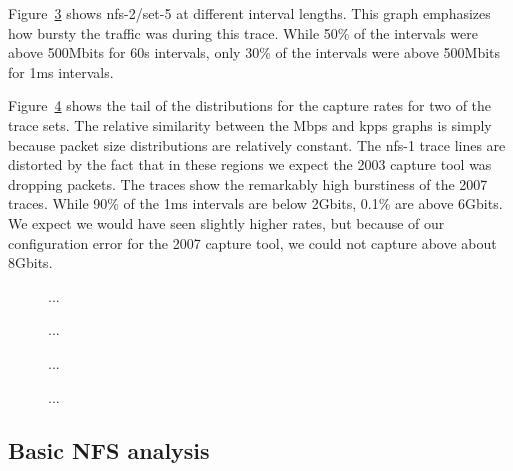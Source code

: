 Figure~\ref{fig:nfs-2-set-5-intervals} shows nfs-2/set-5 at different
interval lengths.  This graph emphasizes how bursty the traffic was
during this trace. While 50\% of the intervals were above 500Mbits for
60s intervals, only 30\% of the intervals were above 500Mbits for 1ms
intervals.

Figure~\ref{fig:capture-tails} shows the tail of the distributions for
the capture rates for two of the trace sets.  The relative similarity
between the Mbps and kpps graphs is simply because packet size
distributions are relatively constant.  The nfs-1 trace lines are
distorted by the fact that in these regions we expect the 2003 capture
tool was dropping packets.  The traces show the remarkably high
burstiness of the 2007 traces.  While 90\% of the 1ms intervals are
below 2Gbits, 0.1\% are above 6Gbits.  We expect we would have seen
slightly higher rates, but because of our configuration error for the
2007 capture tool, we could not capture above about 8Gbits.

\begin{figure}
\caption{...}
\label{fig:mbps-nfs-2}
\end{figure}

\begin{figure}
\caption{...}
\label{fig:mbps-nfs-1}
\end{figure}

\begin{figure}
\caption{...}
\label{fig:nfs-2-set-5-intervals}
\end{figure}

\begin{figure}
\caption{...}
\label{fig:capture-tails}
\end{figure}

\subsection{Basic NFS analysis}


